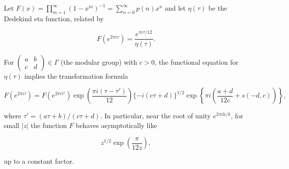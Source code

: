 Let $F(x) = \prod_{m=1}^{\infty} (1-x^m)^{-1} = \sum_{n=0}^{\infty} p(n)x^n$ and let $\eta(\tau)$ be the Dedekind eta function, related by

$$F(e^{2\pi i\tau}) = \frac{e^{\pi i\tau/12}}{\eta(\tau)}.$$

For $\begin{pmatrix} a & b \\ c & d \end{pmatrix} \in \Gamma$ (the modular group) with $c > 0$, the functional equation for $\eta(\tau)$ implies the transformation formula

$$F(e^{2\pi i\tau}) = F(e^{2\pi i\tau'}) \exp\left(\frac{\pi i(\tau - \tau')}{12}\right) \{-i(c\tau + d)\}^{1/2} \exp\left\{\pi i\left(\frac{a + d}{12c} + s(-d, c)\right)\right\},$$

where $\tau' = (a\tau + b)/(c\tau + d)$. In particular, near the root of unity $e^{2\pi ih/k}$, for small $|z|$ the function $F$ behaves asymptotically like

$$z^{1/2} \exp\left(\frac{\pi}{12z}\right),$$

up to a constant factor.
